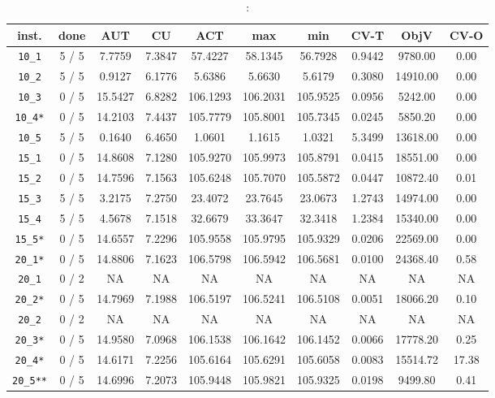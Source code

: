 \begin{table}[h!]
\begin{center}
\small
\begin{tabular}{| c | c | c | c | c | c | c | c | c | c |}
\hline
inst. & done & AUT & CU & ACT & max & min & CV-T & ObjV & CV-O \\
\hline
\verb|10_1| & 5 / 5 & 7.7759 & 7.3847 & 57.4227 & 58.1345 & 56.7928 & 0.9442 & 9780.00 & 0.00\\ 
\verb|10_2| & 5 / 5 & 0.9127 & 6.1776 & 5.6386 & 5.6630 & 5.6179 & 0.3080 & 14910.00 & 0.00\\ 
\verb|10_3| & 0 / 5 & 15.5427 & 6.8282 & 106.1293 & 106.2031 & 105.9525 & 0.0956 & 5242.00 & 0.00\\ 
\verb|10_4*| & 0 / 5 & 14.2103 & 7.4437 & 105.7779 & 105.8001 & 105.7345 & 0.0245 & 5850.20 & 0.00\\ 
\verb|10_5| & 5 / 5 & 0.1640 & 6.4650 & 1.0601 & 1.1615 & 1.0321 & 5.3499 & 13618.00 & 0.00\\ 
\verb|15_1| & 0 / 5 & 14.8608 & 7.1280 & 105.9270 & 105.9973 & 105.8791 & 0.0415 & 18551.00 & 0.00\\ 
\verb|15_2| & 0 / 5 & 14.7596 & 7.1563 & 105.6248 & 105.7070 & 105.5872 & 0.0447 & 10872.40 & 0.01\\ 
\verb|15_3| & 5 / 5 & 3.2175 & 7.2750 & 23.4072 & 23.7645 & 23.0673 & 1.2743 & 14974.00 & 0.00\\ 
\verb|15_4| & 5 / 5 & 4.5678 & 7.1518 & 32.6679 & 33.3647 & 32.3418 & 1.2384 & 15340.00 & 0.00\\ 
\verb|15_5*| & 0 / 5 & 14.6557 & 7.2296 & 105.9558 & 105.9795 & 105.9329 & 0.0206 & 22569.00 & 0.00\\ 
\verb|20_1*| & 0 / 5 & 14.8806 & 7.1623 & 106.5798 & 106.5942 & 106.5681 & 0.0100 & 24368.40 & 0.58\\ 
\verb|20_1| & 0 / 2 & NA & NA & NA & NA & NA & NA & NA & NA\\ 
\verb|20_2*| & 0 / 5 & 14.7969 & 7.1988 & 106.5197 & 106.5241 & 106.5108 & 0.0051 & 18066.20 & 0.10\\ 
\verb|20_2| & 0 / 2 & NA & NA & NA & NA & NA & NA & NA & NA\\ 
\verb|20_3*| & 0 / 5 & 14.9580 & 7.0968 & 106.1538 & 106.1642 & 106.1452 & 0.0066 & 17778.20 & 0.25\\ 
\verb|20_4*| & 0 / 5 & 14.6171 & 7.2256 & 105.6164 & 105.6291 & 105.6058 & 0.0083 & 15514.72 & 17.38\\ 
\verb|20_5**| & 0 / 5 & 14.6996 & 7.2073 & 105.9448 & 105.9821 & 105.9325 & 0.0198 & 9499.80 & 0.41\\ 
\hline
\end{tabular}
\caption{:}
\label{table:hull:5}
\end{center}
\end{table}

